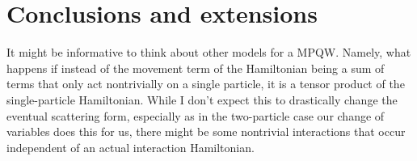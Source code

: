 \documentclass[../thesis-main/thesis-main]{subfiles}
\begin{document}
\section{Conclusions and extensions}

It might be informative to think about other models for a MPQW.  Namely, what happens if instead of the movement term of the Hamiltonian being a sum of terms that only act nontrivially on a single particle, it is a tensor product of the single-particle Hamiltonian.  While I don't expect this to drastically change the eventual scattering form, especially as in the two-particle case our change of variables does this for us, there might be some nontrivial interactions that occur independent of an actual interaction Hamiltonian.




\biblio{}
\end{document}

